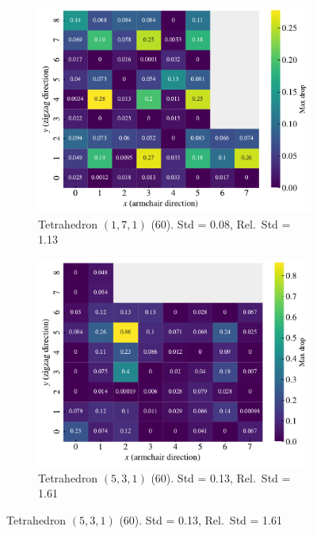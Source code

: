 \begin{figure}[!htb]
  \centering
  \begin{subfigure}[t]{0.49\textwidth}
      \centering
      \includegraphics[width=\textwidth]{figures/search/ref_search_drop_pop_1_7_1_ref_search.pdf}
      \caption{Tetrahedron $(1,7,1)$ (60). Std = 0.08, Rel.\ Std = 1.13}
      \label{fig:tetra_171_trans}
  \end{subfigure}
  \hfill
  \begin{subfigure}[t]{0.49\textwidth}
    \centering
    \includegraphics[width=\textwidth]{figures/search/ref_search_drop_pop_5_3_1_ref_search.pdf}
    \caption{Tetrahedron $(5,3,1)$ (60). Std = 0.13, Rel.\ Std = 1.61}

\end{subfigure}
\end{figure}
